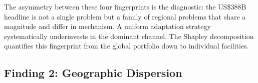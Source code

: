 \begin{twocolbody}
\vspace{5mm}

\noindent The asymmetry between these four fingerprints is the diagnostic: the US\$388B headline is not a single problem but a family of regional problems that share a magnitude and differ in mechanism. A uniform adaptation strategy systematically underinvests in the dominant channel. The Shapley decomposition quantifies this fingerprint from the global portfolio down to individual facilities.

\end{twocolbody}


\vspace{6mm}

\subsection*{Finding 2: Geographic Dispersion}\label{toc:f2}
\greensep

